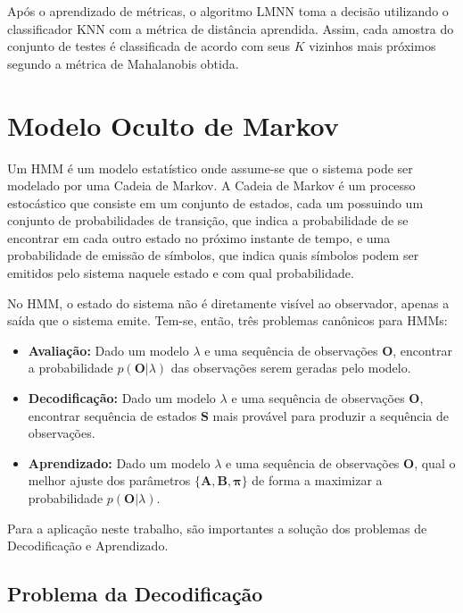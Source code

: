\documentclass[
	12pt,				%
	openright,			%
	twoside,			%
	a4paper,			%
	english,			%
	spanish,			%
	brazil,				%
	]{abntex2}\usepackage[]{graphicx}\usepackage[]{color}
\begin{document}
\par Após o aprendizado de métricas, o algoritmo LMNN toma a decisão utilizando o classificador KNN com a métrica de distância aprendida. Assim, cada amostra do conjunto de testes é classificada de acordo com seus $K$ vizinhos mais próximos segundo a métrica de Mahalanobis obtida.

\section{Modelo Oculto de Markov}

Um HMM é um modelo estatístico onde assume-se que o sistema pode ser modelado por uma Cadeia de Markov. A Cadeia de Markov é um processo estocástico que consiste em um conjunto de estados, cada um possuindo um conjunto de probabilidades de transição, que indica a probabilidade de se encontrar em cada outro estado no próximo instante de tempo, e uma probabilidade de emissão de símbolos, que indica quais símbolos podem ser emitidos pelo sistema naquele estado e com qual probabilidade.

No HMM, o estado do sistema não é diretamente visível ao observador, apenas a saída que o sistema emite. Tem-se, então, três problemas canônicos para HMMs:

\begin{itemize}
    \item \textbf{Avaliação:} Dado um modelo $\lambda$ e uma sequência de observações $\mathbf{O}$, encontrar a probabilidade $p(\mathbf{O}|\lambda)$ das observações serem geradas pelo modelo.
    \item \textbf{Decodificação:} Dado um modelo $\lambda$ e uma sequência de observações $\mathbf{O}$, encontrar sequência de estados $\mathbf{S}$ mais provável para produzir a sequência de observações.
    \item \textbf{Aprendizado:} Dado um modelo $\lambda$ e uma sequência de observações $\mathbf{O}$, qual o melhor ajuste dos parâmetros $\{\mathbf{A,B,\pi}\}$ de forma a maximizar a probabilidade $p(\mathbf{O}|\lambda)$.
\end{itemize}

Para a aplicação neste trabalho, são importantes a solução dos problemas de Decodificação e Aprendizado.

\subsection{Problema da Decodificação}
\end{document}
